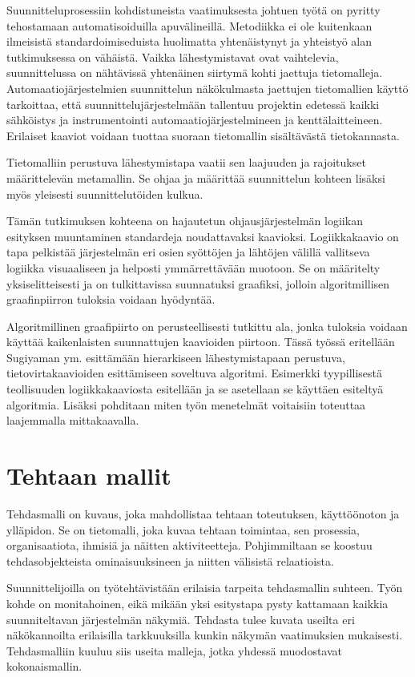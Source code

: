 \documentclass[finnish,12pt]{article}
\begin{document}
Suunnitteluprosessiin kohdistuneista vaatimuksesta johtuen työtä on pyritty tehostamaan automatisoiduilla apuvälineillä.
Metodiikka ei ole kuitenkaan ilmeisistä standardoimiseduista huolimatta yhtenäistynyt ja yhteistyö alan tutkimuksessa on vähäistä.
Vaikka lähestymistavat ovat vaihtelevia, suunnittelussa on nähtävissä yhtenäinen siirtymä kohti jaettuja tietomalleja.
Automaatiojärjestelmien suunnittelun näkökulmasta jaettujen tietomallien käyttö tarkoittaa,
että suunnittelujärjestelmään tallentuu projektin edetessä kaikki sähköistys ja instrumentointi automaatiojärjestelmineen ja kenttälaitteineen.
Erilaiset kaaviot voidaan tuottaa suoraan tietomallin sisältävästä tietokannasta.

Tietomalliin perustuva lähestymistapa vaatii sen laajuuden ja rajoitukset määrittelevän metamallin.
Se ohjaa ja määrittää suunnittelun kohteen lisäksi myös yleisesti suunnittelutöiden kulkua.

Tämän tutkimuksen kohteena on hajautetun ohjausjärjestelmän logiikan esityksen muuntaminen standardeja noudattavaksi kaavioksi.
Logiikkakaavio on tapa pelkistää järjestelmän eri osien syöttöjen ja lähtöjen välillä vallitseva logiikka visuaaliseen ja helposti ymmärrettävään muotoon.
Se on määritelty yksiselitteisesti ja on tulkittavissa suunnatuksi graafiksi, jolloin algoritmillisen graafinpiirron tuloksia voidaan hyödyntää.

Algoritmillinen graafipiirto on perusteellisesti tutkittu ala, jonka tuloksia voidaan käyttää kaikenlaisten suunnattujen kaavioiden piirtoon.
Tässä työssä eritellään Sugiyaman ym. \cite{RefWorks:9} esittämään hierarkiseen lähestymistapaan perustuva, tietovirtakaavioiden esittämiseen soveltuva algoritmi.
Esimerkki tyypillisestä teollisuuden logiikkakaaviosta esitellään ja se asetellaan se käyttäen esiteltyä algoritmia.
Lisäksi pohditaan miten työn menetelmät voitaisiin toteuttaa laajemmalla mittakaavalla.

	\clearpage
	\section{Tehtaan mallit}

Tehdasmalli on kuvaus, joka mahdollistaa tehtaan toteutuksen, käyttöönoton ja ylläpidon.
Se on tietomalli, joka kuvaa tehtaan toimintaa, sen prosessia, organisaatiota, ihmisiä ja näitten aktiviteetteja.
Pohjimmiltaan se koostuu tehdasobjekteista ominaisuuksineen ja niitten välisistä relaatioista. \cite{RefWorks:41}

Suunnittelijoilla on työtehtävistään erilaisia tarpeita tehdasmallin suhteen.
Työn kohde on monitahoinen, eikä mikään yksi esitystapa pysty kattamaan kaikkia suunniteltavan järjestelmän näkymiä.
Tehdasta tulee kuvata useilta eri näkökannoilta erilaisilla tarkkuuksilla kunkin näkymän vaatimuksien mukaisesti.
Tehdasmalliin kuuluu siis useita malleja, jotka yhdessä muodostavat kokonaismallin.
\end{document}

